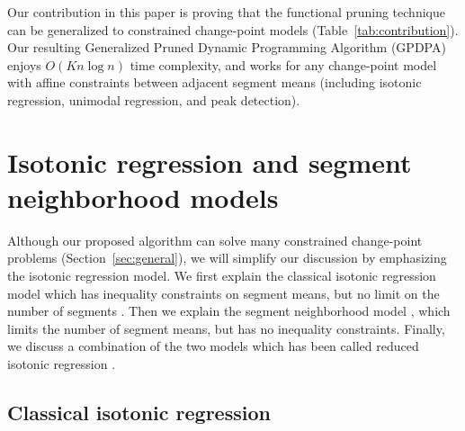 \documentclass{article}
\begin{document}
Our contribution in this paper is proving that the functional pruning
technique can be generalized to constrained change-point models
(Table~\ref{tab:contribution}). Our resulting Generalized Pruned
Dynamic Programming Algorithm (GPDPA) enjoys $O(Kn\log n)$ time
complexity, and works for any change-point model with affine
constraints between adjacent segment means (including isotonic
regression, unimodal regression, and peak detection).



\section{Isotonic regression and segment neighborhood models}
\label{sec:models}

Although our proposed algorithm can solve many constrained
change-point problems (Section~\ref{sec:general}), we will simplify
our discussion by emphasizing the isotonic regression model.  We first
explain the classical isotonic regression model which has inequality
constraints on segment means, but no limit on the number of segments
\citep{mair2009isotone}. Then we explain the segment neighborhood
model \citep{segment-neighborhood}, which limits the number of segment
means, but has no inequality constraints. Finally, we discuss a
combination of the two models which has been called reduced isotonic
regression \citep{reduced-monotonic-regression}.

\subsection{Classical isotonic regression}
\end{document}
